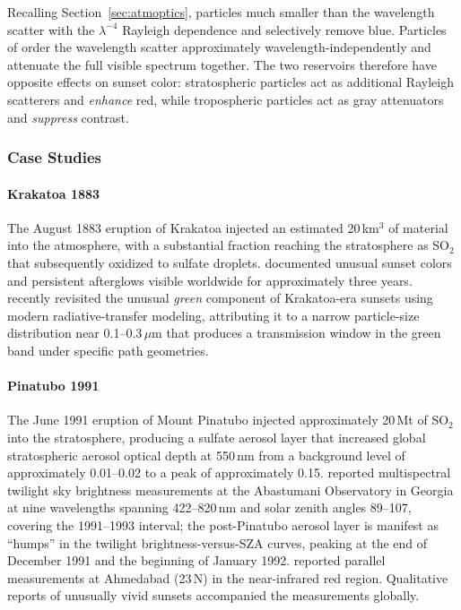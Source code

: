 \documentclass[11pt,a4paper]{article}
\begin{document}
Recalling Section~\ref{sec:atmoptics}, particles much smaller than the wavelength scatter with the $\lambda^{-4}$ Rayleigh dependence and selectively remove blue. Particles of order the wavelength scatter approximately wavelength-independently and attenuate the full visible spectrum together. The two reservoirs therefore have opposite effects on sunset color: stratospheric particles act as additional Rayleigh scatterers and \emph{enhance} red, while tropospheric particles act as gray attenuators and \emph{suppress} contrast.

\subsubsection{Case Studies}

\paragraph{Krakatoa 1883} The August 1883 eruption of Krakatoa injected an estimated 20\,km$^3$ of material into the atmosphere, with a substantial fraction reaching the stratosphere as SO$_2$ that subsequently oxidized to sulfate droplets. \citet{symons1888krakatoa} documented unusual sunset colors and persistent afterglows visible worldwide for approximately three years. \citet{ribeiro2024krakatoa} recently revisited the unusual \emph{green} component of Krakatoa-era sunsets using modern radiative-transfer modeling, attributing it to a narrow particle-size distribution near 0.1--0.3\,$\mu$m that produces a transmission window in the green band under specific path geometries.

\paragraph{Pinatubo 1991} The June 1991 eruption of Mount Pinatubo injected approximately 20\,Mt of SO$_2$ into the stratosphere, producing a sulfate aerosol layer that increased global stratospheric aerosol optical depth at 550\,nm from a background level of approximately 0.01--0.02 to a peak of approximately 0.15. \citet{mateshvili2005twilight} reported multispectral twilight sky brightness measurements at the Abastumani Observatory in Georgia at nine wavelengths spanning 422--820\,nm and solar zenith angles 89\textdegree--107\textdegree, covering the 1991--1993 interval; the post-Pinatubo aerosol layer is manifest as ``humps'' in the twilight brightness-versus-SZA curves, peaking at the end of December 1991 and the beginning of January 1992. \citet{mishra1996spectroscopic} reported parallel measurements at Ahmedabad (23\textdegree\,N) in the near-infrared red region. Qualitative reports of unusually vivid sunsets accompanied the measurements globally.
\end{document}
